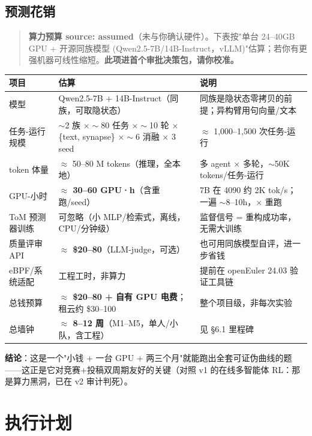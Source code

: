 \documentclass[UTF8,fontset=windows,11pt]{ctexart}
\begin{document}
\subsection{预测花销}
\begin{quote}\small
\textbf{算力预算 source: assumed}（未与你确认硬件）。下表按"单台 24--40GB GPU + 开源同族模型 (Qwen2.5-7B/14B-Instruct，vLLM)"估算；若你有更强机器可线性缩短。\textbf{此项进首个审批决策包，请你校准。}
\end{quote}
\begin{table}[h]\small\centering
\renewcommand{\arraystretch}{1.22}
\begin{tabularx}{\linewidth}{@{}p{3.0cm}p{4.2cm}Y@{}}
\toprule
\textbf{项目} & \textbf{估算} & \textbf{说明} \\
\midrule
模型 & Qwen2.5-7B + 14B-Instruct（同族，可取隐状态） & 同族是隐状态零拷贝的前提；异构臂用句向量/文本 \\
任务-运行规模 & $\sim$2 族 $\times\sim$80 任务 $\times\sim$10 轮 $\times$ \{text, synapse\} $\times\sim$6 消融 $\times$ 3 seed & $\approx$ 1{,}000--1{,}500 次任务-运行 \\
token 体量 & $\approx$ 50--80 M tokens（推理，全本地） & 多 agent $\times$ 多轮，$\sim$50K tokens/任务-运行 \\
GPU-小时 & \textbf{$\approx$ 30--60 GPU·h}（含重跑/seed） & 7B 在 4090 约 2K tok/s；一遍 $\sim$8--10h，$\times$ 重跑 \\
ToM 预测器训练 & 可忽略（小 MLP/检索式，离线，CPU/分钟级） & 监督信号 = 重构成功率，无需大训练 \\
质量评审 API & \textbf{$\approx$ \$20--80}（LLM-judge，可选） & 也可用同族模型自评，进一步省钱 \\
eBPF/系统适配 & 工程工时，非算力 & 提前在 openEuler 24.03 验证工具链 \\
总钱预算 & \textbf{$\approx$ \$20--80 + 自有 GPU 电费}；租云约 \$30--100 & 整个项目级，非每次实验 \\
总墙钟 & \textbf{$\approx$ 8--12 周}（M1--M5，单人/小队，含工程） & 见 §6.1 里程碑 \\
\bottomrule
\end{tabularx}
\end{table}

\noindent\textbf{结论}：这是一个"小钱 + 一台 GPU + 两三个月"就能跑出全套可证伪曲线的题——这正是它对竞赛+投稿双周期友好的关键（对照 v1 的在线多智能体 RL：那是算力黑洞，已在 v2 审计判死）。

\section{执行计划}
\end{document}
